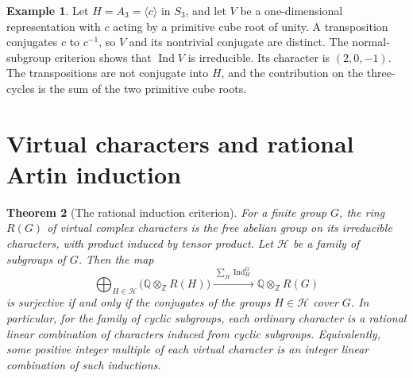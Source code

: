 \documentclass[11pt,oneside,openany]{book}
\newtheorem{theorem}{Theorem}[chapter]
\theoremstyle{definition}
\newtheorem{example}[theorem]{Example}
\theoremstyle{remark}
\begin{document}
\begin{example}
Let \(H=A_3=\langle c\rangle\) in \(S_3\), and let \(V\) be a
one-dimensional representation with \(c\) acting by a primitive
cube root of unity. A transposition conjugates \(c\) to \(c^{-1}\),
so \(V\) and its nontrivial conjugate are distinct.
The normal-subgroup criterion shows that \(\operatorname{Ind}V\)
is irreducible. Its character is \((2,0,-1)\). The transpositions
are not conjugate into \(H\), and the contribution on the
three-cycles is the sum of the two primitive cube roots.
\end{example}

\section{Virtual characters and rational Artin induction}

\begin{theorem}[The rational induction criterion]
\label{p103:ALG-07-C03-S05}
For a finite group \(G\), the ring \(R(G)\) of virtual complex
characters is the free abelian group on its irreducible
characters, with product induced by tensor product.
Let \(\mathcal H\) be a family of subgroups of \(G\).
Then the map
\[
 \bigoplus_{H\in\mathcal H}\bigl(\mathbb Q\otimes_{\mathbb Z}R(H)\bigr)
       \xrightarrow{\ \sum_H\operatorname{Ind}_H^G\ }
       \mathbb Q\otimes_{\mathbb Z}R(G)
\]
is surjective if and only if the conjugates of the groups
\(H\in\mathcal H\) cover \(G\). In particular, for the family of
cyclic subgroups, each ordinary character is a rational linear
combination of characters induced from cyclic subgroups.
Equivalently, some positive integer multiple of each virtual
character is an integer linear combination of such inductions.
\end{theorem}
\end{document}
